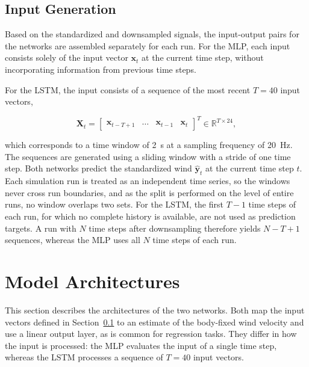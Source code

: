 \subsection{Input Generation}
\label{sec:4.2.3InputGeneration}

Based on the standardized and downsampled signals, the input-output pairs for the networks are assembled separately for each run. For the MLP, each input consists solely of the input vector $\bm{x}_t$ at the current time step, without incorporating information from previous time steps.

For the LSTM, the input consists of a sequence of the most recent $T = 40$ input vectors,

\begin{equation}
	\bm{X}_t = \begin{bmatrix} \bm{x}_{t-T+1} & \dots & \bm{x}_{t-1} & \bm{x}_t \end{bmatrix}^T \in \mathbb{R}^{T \times 24},
	\label{eq:lstm_sequence}
\end{equation}

which corresponds to a time window of \SI{2}{\second} at a sampling frequency of \SI{20}{\hertz}. The sequences are generated using a sliding window with a stride of one time step. Both networks predict the standardized wind $\hat{\bm{y}}_t$ at the current time step $t$. Each simulation run is treated as an independent time series, so the windows never cross run boundaries, and as the split is performed on the level of entire runs, no window overlaps two sets. For the LSTM, the first $T-1$ time steps of each run, for which no complete history is available, are not used as prediction targets. A run with $N$ time steps after downsampling therefore yields $N - T + 1$ sequences, whereas the MLP uses all $N$ time steps of each run.






\section{Model Architectures}
\label{sec:4.3ModelArchitectures}

This section describes the architectures of the two networks. Both map the input vectors defined in Section~\ref{sec:4.2.3InputGeneration} to an estimate of the body-fixed wind velocity and use a linear output layer, as is common for regression tasks. They differ in how the input is processed: the MLP evaluates the input of a single time step, whereas the LSTM processes a sequence of $T = 40$ input vectors. 

